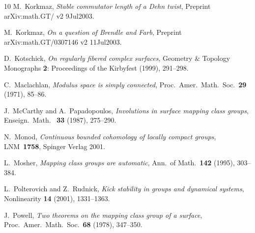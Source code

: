 \documentclass[12pt]{amsart}
\theoremstyle{remark}
\theoremstyle{definition}
\begin{document}
\begin{thebibliography}{10}
M.~Korkmaz, {\em Stable commutator length of a Dehn twist}, Preprint 
arXiv\-:\-math\-.\-GT\-/ v2 9Jul2003.

M.~Korkmaz, {\em On a question of Brendle and Farb}, Preprint 
arXiv:math.GT/0307146 v2 11Jul2003.

D.~Kotschick, {\em On regularly fibered complex surfaces},
Geometry $\&$ Topology Monographs {\bf 2}: Proceedings of the 
Kirbyfest (1999), 291--298.

C.~Maclachlan, {\em Modulus space is simply connected},
Proc.~Amer.~Math.~Soc.~{\bf 29} (1971), 85--86.

J.~McCarthy and A.~Papadopoulos, 
{\em Involutions in surface mapping class groups}, Enseign.~Math.~{\bf 
33} (1987), 275--290.

N.~Monod, {\sl Continuous bounded cohomology of locally compact 
groups}, LNM~{\bf 1758}, Spinger Verlag 2001.

L.~Mosher, {\em Mapping class groups are automatic}, Ann.~of 
Math.~{\bf 142} (1995), 303--384.

L.~Polterovich and Z.~Rudnick,
{\em Kick stability in groups and dynamical systems}, Nonlinearity 
{\bf 14} (2001), 1331--1363.

J.~Powell, {\em Two theorems on the mapping class group of a surface}, 
Proc.~Amer.~Math.~Soc.~{\bf 68} (1978), 347--350.

\end{thebibliography}

\bigskip
\end{document}
